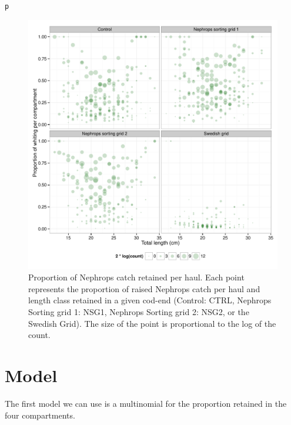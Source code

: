 \documentclass[12pt]{article}\usepackage[]{graphicx}\usepackage[]{color}
\makeatletter
\def\maxwidth{ %
  \ifdim\Gin@nat@width>\linewidth
    \linewidth
  \else
    \Gin@nat@width
  \fi
}
\newcommand{\hlstd}[1]{\textcolor[rgb]{0.345,0.345,0.345}{#1}}%
\newenvironment{kframe}{%
 \def\at@end@of@kframe{}%
 \ifinner\ifhmode%
  \def\at@end@of@kframe{\end{minipage}}%
  \begin{minipage}{\columnwidth}%
 \fi\fi%
 \def\FrameCommand##1{\hskip\@totalleftmargin \hskip-\fboxsep
 \colorbox{shadecolor}{##1}\hskip-\fboxsep
     \hskip-\linewidth \hskip-\@totalleftmargin \hskip\columnwidth}%
 \MakeFramed {\advance\hsize-\width
   \@totalleftmargin\z@ \linewidth\hsize
   \@setminipage}}%
 {\par\unskip\endMakeFramed%
 \at@end@of@kframe}
\newenvironment{knitrout}{}{} %
\makeatother
\begin{document}
\begin{knitrout}
\begin{kframe}
\begin{alltt}
\hlstd{p}
\end{alltt}
\end{kframe}\begin{figure}
\includegraphics[width=\maxwidth]{figure/unnamed-chunk-5-1} \caption[Proportion of Nephrops catch retained per haul]{Proportion of Nephrops catch retained per haul. Each point represents the proportion of raised Nephrops catch per haul and length class retained in a given cod-end (Control: CTRL, Nephrops Sorting grid 1: NSG1, Nephrops Sorting grid 2: NSG2, or the Swedish Grid). The size of the point is proportional to the log of the count.}\label{fig:unnamed-chunk-5}
\end{figure}


\end{knitrout}

\section{Model}
The first model we can use is a multinomial for the proportion retained in the four compartments. 
\end{document}
